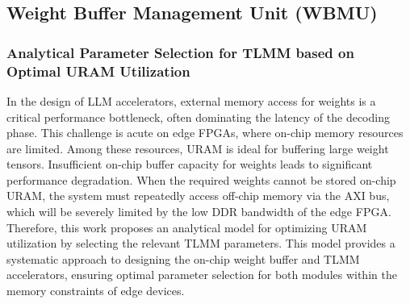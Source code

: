 \documentclass[sigconf]{acmart}
\begin{document}
\subsection{Weight Buffer Management Unit (WBMU)} \label{SEC:WBMU}
\subsubsection{Analytical Parameter Selection for TLMM based on Optimal URAM Utilization} \label{SEC:PARAMETER_WBMU}

In the design of LLM accelerators, external memory access for weights is a critical performance bottleneck, often dominating the latency of the decoding phase. This challenge is acute on edge FPGAs, where on-chip memory resources are limited. Among these resources, URAM is ideal for buffering large weight tensors.
Insufficient on-chip buffer capacity for weights leads to significant performance degradation. When the required weights cannot be stored on-chip URAM, the system must repeatedly access off-chip memory via the AXI bus, which will be severely limited by the low DDR bandwidth of the edge FPGA. 
Therefore, this work proposes an analytical model for optimizing URAM utilization by selecting the relevant TLMM parameters. This model provides a systematic approach to designing the on-chip weight buffer and TLMM accelerators, ensuring optimal parameter selection for both modules within the memory constraints of edge devices.
\end{document}
